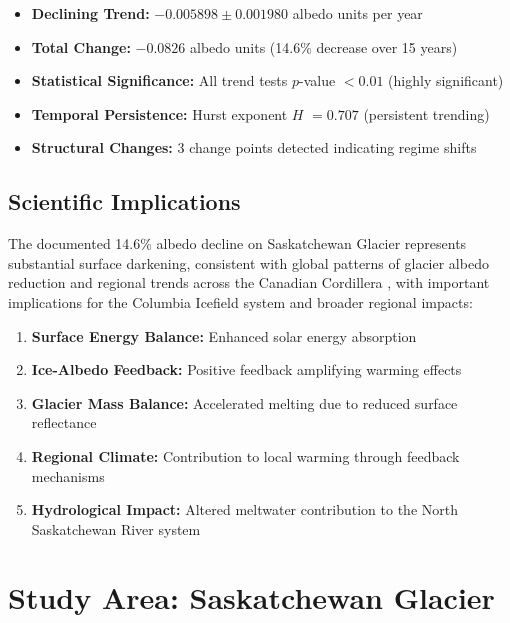\documentclass[12pt,a4paper]{article}
\newcommand{\pvalue}{$p$-value}
\newcommand{\hurst}{$H$}
\begin{document}
\begin{itemize}
    \item \textbf{Declining Trend:} $-0.005898 \pm 0.001980$ albedo units per year
    \item \textbf{Total Change:} $-0.0826$ albedo units (14.6\% decrease over 15 years)
    \item \textbf{Statistical Significance:} All trend tests \pvalue{} $< 0.01$ (highly significant)
    \item \textbf{Temporal Persistence:} Hurst exponent \hurst{} $= 0.707$ (persistent trending)
    \item \textbf{Structural Changes:} 3 change points detected indicating regime shifts
\end{itemize}

\subsection{Scientific Implications}

The documented 14.6\% albedo decline on Saskatchewan Glacier represents substantial surface darkening, consistent with global patterns of glacier albedo reduction \cite{Huss2021GlobalGlacierAlbedo, Wang2025GlobalAlbedoTrends} and regional trends across the Canadian Cordillera \cite{Minder2021AlbedoTrendCanada, Li2020CanadianRockiesAlbedo}, with important implications for the Columbia Icefield system and broader regional impacts:
\begin{enumerate}
    \item \textbf{Surface Energy Balance:} Enhanced solar energy absorption
    \item \textbf{Ice-Albedo Feedback:} Positive feedback amplifying warming effects \cite{Box2017GreenlandAlbedo, VanTricht2016GreenlandAlbedoClouds}
    \item \textbf{Glacier Mass Balance:} Accelerated melting due to reduced surface reflectance
    \item \textbf{Regional Climate:} Contribution to local warming through feedback mechanisms
    \item \textbf{Hydrological Impact:} Altered meltwater contribution to the North Saskatchewan River system
\end{enumerate}

\section{Study Area: Saskatchewan Glacier}
\end{document}
